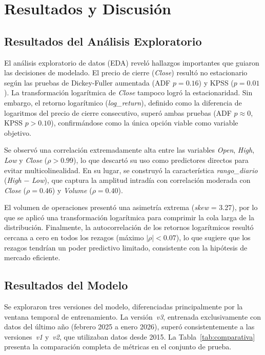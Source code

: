\documentclass[12pt,a4paper]{article}
\begin{document}
\newpage

\section{Resultados y Discusión}
\label{sec:resultados}

\subsection{Resultados del Análisis Exploratorio}

El análisis exploratorio de datos (EDA) reveló hallazgos importantes que guiaron las decisiones de modelado. El precio de cierre (\textit{Close}) resultó no estacionario según las pruebas de Dickey-Fuller aumentada (ADF $p=0.16$) y KPSS ($p=0.01$). La transformación logarítmica de \textit{Close} tampoco logró la estacionaridad. Sin embargo, el retorno logarítmico (\textit{log\_return}), definido como la diferencia de logaritmos del precio de cierre consecutivo, superó ambas pruebas (ADF $p \approx 0$, KPSS $p > 0.10$), confirmándose como la única opción viable como variable objetivo.

Se observó una correlación extremadamente alta entre las variables \textit{Open}, \textit{High}, \textit{Low} y \textit{Close} ($\rho > 0.99$), lo que descartó su uso como predictores directos para evitar multicolinealidad. En su lugar, se construyó la característica \textit{rango\_diario} (\textit{High} $-$ \textit{Low}), que captura la amplitud intradía con correlación moderada con \textit{Close} ($\rho = 0.46$) y \textit{Volume} ($\rho = 0.40$).

El volumen de operaciones presentó una asimetría extrema (\textit{skew} = 3.27), por lo que se aplicó una transformación logarítmica para comprimir la cola larga de la distribución. Finalmente, la autocorrelación de los retornos logarítmicos resultó cercana a cero en todos los rezagos (máximo $|\rho| < 0.07$), lo que sugiere que los rezagos tendrían un poder predictivo limitado, consistente con la hipótesis de mercado eficiente.

\subsection{Resultados del Modelo}

Se exploraron tres versiones del modelo, diferenciadas principalmente por la ventana temporal de entrenamiento. La versión~\textit{v3}, entrenada exclusivamente con datos del último año (febrero 2025 a enero 2026), superó consistentemente a las versiones~\textit{v1} y~\textit{v2}, que utilizaban datos desde 2015. La Tabla~\ref{tab:comparativa} presenta la comparación completa de métricas en el conjunto de prueba.
\end{document}
